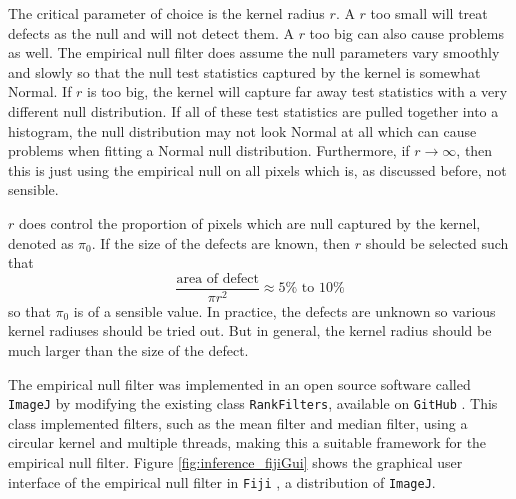 The critical parameter of choice is the kernel radius $r$. A $r$ too small will treat defects as the null and will not detect them. A $r$ too big can also cause problems as well. The empirical null filter does assume the null parameters vary smoothly and slowly so that the null test statistics captured by the kernel is somewhat Normal. If $r$ is too big, the kernel will capture far away test statistics with a very different null distribution. If all of these test statistics are pulled together into a histogram, the null distribution may not look Normal at all which can cause problems when fitting a Normal null distribution. Furthermore, if $r\rightarrow \infty$, then this is just using the empirical null on all pixels which is, as discussed before, not sensible.

$r$ does control the proportion of pixels which are null captured by the kernel, denoted as $\pi_0$. If the size of the defects are known, then $r$ should be selected such that
\begin{equation}
\dfrac{
  \text{area of defect}
}
{
  \pi r^2
}
\approx
5\% \text{ to } 10 \%
\end{equation}
so that $\pi_0$ is of a sensible value. In practice, the defects are unknown so various kernel radiuses should be tried out. But in general, the kernel radius should be much larger than the size of the defect.

The empirical null filter was implemented in an open source software called \texttt{ImageJ} \citep{abramoff2004image, schneider2012nih, perez2013image} by modifying the existing class \texttt{RankFilters}, available on \texttt{GitHub} \citep{imagej2018rank}. This class implemented filters, such as the mean filter and median filter, using a circular kernel and multiple threads, making this a suitable framework for the empirical null filter. Figure \ref{fig:inference_fijiGui} shows the graphical user interface of the empirical null filter in \texttt{Fiji} \citep{schindelin2012fiji}, a distribution of \texttt{ImageJ}.

